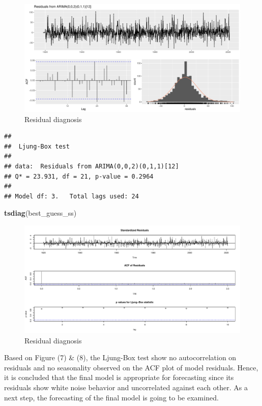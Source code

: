 \documentclass[
  11pt,
]{article}
\newenvironment{Shaded}{\begin{snugshade}}{\end{snugshade}}
\newcommand{\KeywordTok}[1]{\textcolor[rgb]{0.13,0.29,0.53}{\textbf{#1}}}
\newcommand{\NormalTok}[1]{#1}
\begin{document}
\begin{figure}
\centering
\includegraphics{ST422_files/figure-latex/unnamed-chunk-14-1.pdf}
\caption{Residual diagnosis}
\end{figure}

\begin{verbatim}
## 
##  Ljung-Box test
## 
## data:  Residuals from ARIMA(0,0,2)(0,1,1)[12]
## Q* = 23.931, df = 21, p-value = 0.2964
## 
## Model df: 3.   Total lags used: 24
\end{verbatim}

\begin{Shaded}
\begin{Highlighting}[]
\KeywordTok{tsdiag}\NormalTok{(best_guess_ss)}
\end{Highlighting}
\end{Shaded}

\begin{figure}
\centering
\includegraphics{ST422_files/figure-latex/unnamed-chunk-14-2.pdf}
\caption{Residual diagnosis}
\end{figure}

\newpage

Based on Figure (7) \& (8), the Ljung-Box test show no autocorrelation
on residuals and no seasonality observed on the ACF plot of model
residuals. Hence, it is concluded that the final model is appropriate
for forecasting since its residuals show white noise behavior and
uncorrelated against each other. As a next step, the forecasting of the
final model is going to be examined.
\end{document}
